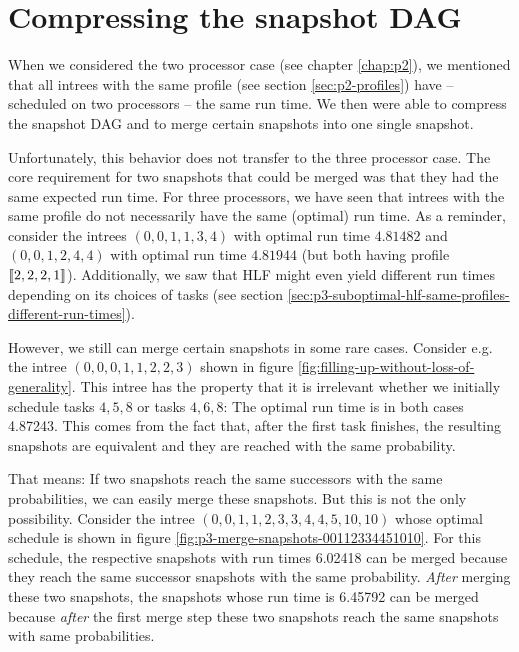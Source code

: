 
\section{Compressing the snapshot DAG}
\label{sec:p3-compress-snapshots}

When we considered the two processor case (see chapter \ref{chap:p2}), we mentioned that all intrees with the same profile (see section \ref{sec:p2-profiles}) have -- scheduled on two processors -- the same run time. We then were able to compress the snapshot DAG and to merge certain snapshots into one single snapshot.

Unfortunately, this behavior does not transfer to the three processor case. The core requirement for two snapshots that could be merged was that they had the same expected run time. For three processors, we have seen that intrees with the same profile do not necessarily have the same (optimal) run time. As a reminder, consider the intrees $(0,0,1,1,3,4)$ with optimal run time $4.81482$ and $(0,0,1,2,4,4)$ with optimal run time $4.81944$ (but both having profile $\left\llbracket 2,2,2,1 \right\rrbracket$). Additionally, we saw that HLF might even yield different run times depending on its choices of tasks (see section \ref{sec:p3-suboptimal-hlf-same-profiles-different-run-times}).

However, we still can merge certain snapshots in some rare cases. Consider e.g. the intree $(0,0,0,1,1,2,2,3)$ shown in figure \ref{fig:filling-up-without-loss-of-generality}. This intree has the property that it is irrelevant whether we initially schedule tasks $4,5,8$ or tasks $4,6,8$: The optimal run time is in both cases 4.87243. This comes from the fact that, after the first task finishes, the resulting snapshots are equivalent and they are reached with the same probability.

That means: If two snapshots reach the same successors with the same probabilities, we can easily merge these snapshots. But this is not the only possibility. Consider the intree $(0,0,1,1,2,3,3,4,4,5,10,10)$ whose optimal schedule is shown in figure \ref{fig:p3-merge-snapshots-00112334451010}. For this schedule, the respective snapshots with run times 6.02418 can be merged because they reach the same successor snapshots with the same probability. \emph{After} merging these two snapshots, the snapshots whose run time is 6.45792 can be merged because \emph{after} the first merge step these two snapshots reach the same snapshots with same probabilities. 

